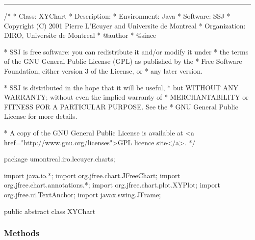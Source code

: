 \bigskip\hrule
\begin{code}
\begin{hide}
/*
 * Class:        XYChart
 * Description:
 * Environment:  Java
 * Software:     SSJ
 * Copyright (C) 2001  Pierre L'Ecuyer and Universite de Montreal
 * Organization: DIRO, Universite de Montreal
 * @author
 * @since

 * SSJ is free software: you can redistribute it and/or modify it under
 * the terms of the GNU General Public License (GPL) as published by the
 * Free Software Foundation, either version 3 of the License, or
 * any later version.

 * SSJ is distributed in the hope that it will be useful,
 * but WITHOUT ANY WARRANTY; without even the implied warranty of
 * MERCHANTABILITY or FITNESS FOR A PARTICULAR PURPOSE.  See the
 * GNU General Public License for more details.

 * A copy of the GNU General Public License is available at
   <a href="http://www.gnu.org/licenses">GPL licence site</a>.
 */
\end{hide}
package umontreal.iro.lecuyer.charts;\begin{hide}
import java.io.*;
import org.jfree.chart.JFreeChart;
import org.jfree.chart.annotations.*;
import org.jfree.chart.plot.XYPlot;
import org.jfree.ui.TextAnchor;
import javax.swing.JFrame;\end{hide}

public abstract class XYChart \begin{hide} {
   protected Axis XAxis;
   protected Axis YAxis;

   protected SSJXYSeriesCollection dataset;
   protected JFreeChart chart;
   protected boolean latexDocFlag = true;

   protected boolean autoRange;
   protected double[] manualRange;

   protected boolean grid = false;
   protected double xstepGrid;
   protected double ystepGrid;

   // this flag is set true when plotting probabilities. In that case,
   // y is always >= 0.
   protected boolean probFlag = false;

   protected double chartMargin = 0.02;   // margin around the chart
\end{hide}
\end{code}

\subsubsection*{Methods}

